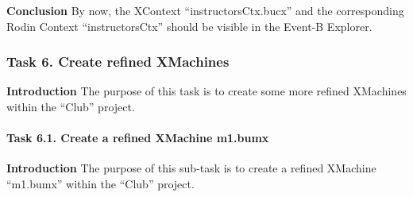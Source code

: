 \textbf{Conclusion} By now, the XContext ``instructorsCtx.bucx'' and the corresponding Rodin Context ``instructorsCtx'' should be visible in the Event-B Explorer.

\subsubsection{Task 6. Create refined XMachines}
\textbf{Introduction} The purpose of this task is to create some more refined XMachines within the ``Club'' project.

\paragraph{Task 6.1. Create a refined XMachine m1.bumx}
\textbf{Introduction} The purpose of this sub-task is to create a refined XMachine ``m1.bumx'' within the ``Club'' project.

